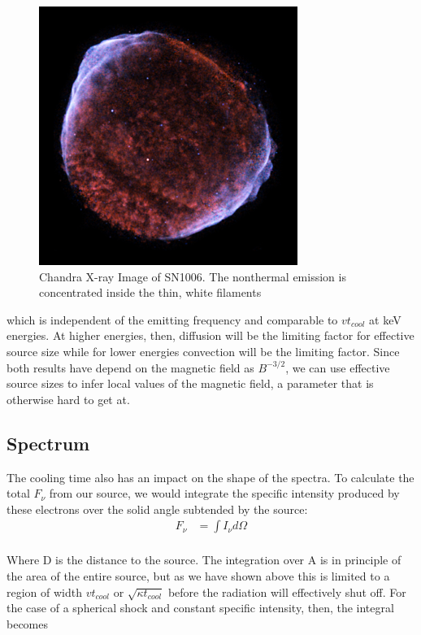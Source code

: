 \documentclass{article}
\begin{document}
\begin{figure}
    \centering
    \includegraphics[width=0.75\textwidth]{SN1006Chandra.png}
    \caption{Chandra X-ray Image of SN1006. The nonthermal emission is concentrated inside the thin, white filaments}
    \label{fig:sn1006}
\end{figure}

which is independent of the emitting frequency and comparable to $vt_{cool}$ at keV energies. At higher energies, then, diffusion will be the limiting factor for effective source size while for lower energies convection will be the limiting factor.  Since both results have depend on the magnetic field as $B^{-3/2}$, we can use effective source sizes to infer local values of the magnetic field, a parameter that is otherwise hard to get at.

\subsection{Spectrum}

The cooling time also has an impact on the shape of the spectra.  To calculate the total $F_\nu$ from our source, we would integrate the specific intensity produced by these electrons over the solid angle subtended by the source:
$$\begin{aligned} F_\nu &= \int I_{\nu} d \Omega
 \\
 \end{aligned}$$

Where D is the distance to the source.  The integration over A is in principle of the area of the entire source, but as we have shown above this is limited to a region of width $vt_{cool}$ or $\sqrt{\kappa t_{cool}}$ before the radiation will effectively shut off.  For the case of a spherical shock and constant specific intensity, then, the integral becomes
 
\end{document}
